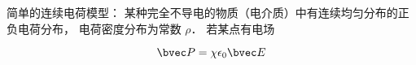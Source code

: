 
简单的连续电荷模型： 某种完全不导电的物质（电介质）中有连续均匀分布的正负电荷分布， 电荷密度分布为常数 $\rho$． 若某点有电场



\begin{equation}
\bvec P = \chi \epsilon_0 \bvec E
\end{equation}
